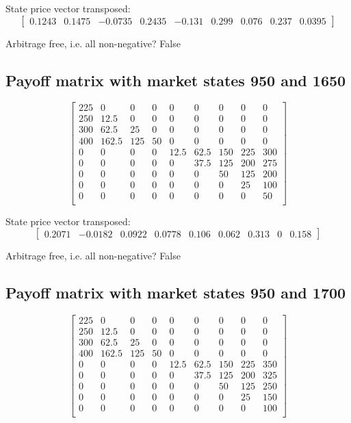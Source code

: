 \documentclass{article}
\begin{document}
State price vector transposed: \[
    \begin{bmatrix} 0.1243 & 0.1475 & -0.0735 & 0.2435 & -0.131 & 0.299 & 0.076 & 0.237 & 0.0395 \end{bmatrix}
\]

Arbitrage free, i.e. all non-negative? False

\subsection{Payoff matrix with market states 950 and 1650}
\[
    \begin{bmatrix}
        225 & 0     & 0   & 0  & 0    & 0    & 0   & 0   & 0   \\
        250 & 12.5  & 0   & 0  & 0    & 0    & 0   & 0   & 0   \\
        300 & 62.5  & 25  & 0  & 0    & 0    & 0   & 0   & 0   \\
        400 & 162.5 & 125 & 50 & 0    & 0    & 0   & 0   & 0   \\
        0   & 0     & 0   & 0  & 12.5 & 62.5 & 150 & 225 & 300 \\
        0   & 0     & 0   & 0  & 0    & 37.5 & 125 & 200 & 275 \\
        0   & 0     & 0   & 0  & 0    & 0    & 50  & 125 & 200 \\
        0   & 0     & 0   & 0  & 0    & 0    & 0   & 25  & 100 \\
        0   & 0     & 0   & 0  & 0    & 0    & 0   & 0   & 50  \\
    \end{bmatrix}
\]

State price vector transposed: \[
    \begin{bmatrix} 0.2071 & -0.0182 & 0.0922 & 0.0778 & 0.106 & 0.062 & 0.313 & 0& 0.158 \end{bmatrix}
\]

Arbitrage free, i.e. all non-negative? False

\subsection{Payoff matrix with market states 950 and 1700}
\[
    \begin{bmatrix}
        225 & 0     & 0   & 0  & 0    & 0    & 0   & 0   & 0   \\
        250 & 12.5  & 0   & 0  & 0    & 0    & 0   & 0   & 0   \\
        300 & 62.5  & 25  & 0  & 0    & 0    & 0   & 0   & 0   \\
        400 & 162.5 & 125 & 50 & 0    & 0    & 0   & 0   & 0   \\
        0   & 0     & 0   & 0  & 12.5 & 62.5 & 150 & 225 & 350 \\
        0   & 0     & 0   & 0  & 0    & 37.5 & 125 & 200 & 325 \\
        0   & 0     & 0   & 0  & 0    & 0    & 50  & 125 & 250 \\
        0   & 0     & 0   & 0  & 0    & 0    & 0   & 25  & 150 \\
        0   & 0     & 0   & 0  & 0    & 0    & 0   & 0   & 100 \\
    \end{bmatrix}
\]
\end{document}
